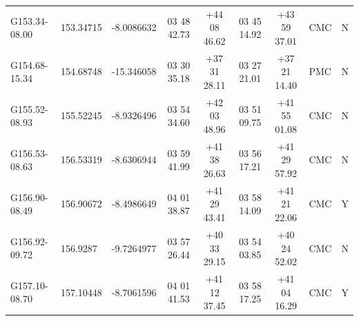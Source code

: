 \documentclass[UTF8, nocolorlinks]{pkuthss}
\begin{document}
	\label{Tab.SourceList}
		\begin{footnotesize}
		\begin{center}
		\setlength{\tabcolsep}{0.04in}
		\tablelasttail{\hline\bottomrule}
		\begin{supertabular}{lllcccclr}
		G153.34-08.00 & 153.34715 &   -8.0086632  & 03 48 42.73 & +44 08 46.62 & 03 45 14.92 & +43 59 37.01   & CMC  & N\\
		G154.68-15.34 & 154.68748 &  -15.346058   & 03 30 35.18 & +37 31 28.11 & 03 27 21.01 & +37 21 14.40   & PMC  & N\\
		G155.52-08.93 & 155.52245 &   -8.9326496  & 03 54 34.60 & +42 03 48.96 & 03 51 09.75 & +41 55 01.08   & CMC  & N\\
		G156.53-08.63 & 156.53319 &   -8.6306944  & 03 59 41.99 & +41 38 26.63 & 03 56 17.21 & +41 29 57.92   & CMC  & N\\
		G156.90-08.49 & 156.90672 &   -8.4986649  & 04 01 38.87 & +41 29 43.41 & 03 58 14.09 & +41 21 22.06   & CMC  & Y\\
		G156.92-09.72 & 156.9287  &   -9.7264977  & 03 57 26.44 & +40 33 29.15 & 03 54 03.85 & +40 24 52.02   & CMC  & N\\
		G157.10-08.70 & 157.10448 &   -8.7061596  & 04 01 41.53 & +41 12 37.45 & 03 58 17.25 & +41 04 16.29   & CMC  & Y\\

\end{supertabular}
\end{center}
\end{footnotesize}
\end{document}

